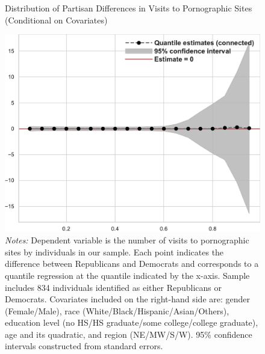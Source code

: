 \documentclass[12pt, letterpaper]{article}
\begin{document}
\begin{figure}
	\centering
	\caption{Distribution of Partisan Differences in Visits to Pornographic Sites (Conditional on Covariates)}
	\includegraphics[width=.55\linewidth]{../figs/quantile_reg_covariates_visits_adult.pdf}
	\caption*{\footnotesize \emph{Notes:} 
		Dependent variable is the number of visits to pornographic sites by individuals in our sample.
		Each point indicates the difference between Republicans and Democrats and corresponds to a quantile regression at the quantile indicated by the x-axis.
		Sample includes 834 individuals identified as either Republicans or Democrats.
		Covariates included on the right-hand side are: gender (Female/Male), race (White/Black/Hispanic/Asian/Others), education level (no HS/HS graduate/some college/college graduate), age and its quadratic, and region (NE/MW/S/W).
		95\% confidence intervals constructed from standard errors.
	}
	\label{fig:quantile_regression_visits_covariates}
\end{figure}
\end{document}
